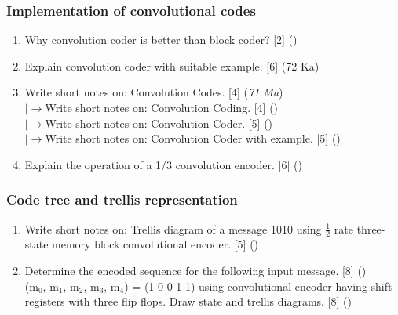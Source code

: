 \documentclass[12pt]{article}
\newcommand{\lb}{\\$\left|\rightarrow\right.$}
\begin{document}
    \subsubsection{Implementation of convolutional codes}
      \begin{enumerate}
        \item Why convolution coder is better than block coder? \hfill [2] ()
        
        \item Explain convolution coder with suitable example. \hfill [6] (72 Ka)

        \item Write short notes on: Convolution Codes. \hfill [4] (\textit{71 Ma})
        \lb Write short notes on: Convolution Coding. \hfill [4] ()
        \lb Write short notes on: Convolution Coder. \hfill [5] ()
        \lb Write short notes on: Convolution Coder with example. \hfill [5] ()
        
        \item Explain the operation of a 1/3 convolution encoder. \hfill [6] ()
      \end{enumerate}

    \subsubsection{Code tree and trellis representation}
      \begin{enumerate}
        \item Write short notes on: Trellis diagram of a message 1010 using $\frac{1}{2}$ rate three-state memory block convolutional encoder. \hfill [5] ()

        \item Determine the encoded sequence for the following input message. \hfill [8] ()\\
        (m$_0$, m$_1$, m$_2$, m$_3$, m$_4$) = (1 0 0 1 1) using convolutional encoder having shift registers with three flip flops. Draw state and trellis diagrams. \hfill [8] ()
      \end{enumerate}
\end{document}
